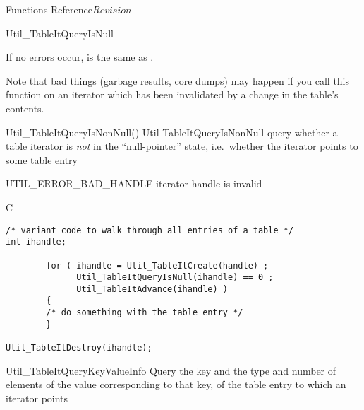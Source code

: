 \begin{cactuspart}{ Functions Reference}{}{$Revision$}
\begin{FunctionDescription}{Util\_TableItQueryIsNull}
\begin{Discussion}
If no errors occur,
is the same as
.

Note that bad things (garbage results, core dumps) may happen if
you call this function on an iterator which has been invalidated
by a change in the table's contents.
\end{Discussion}

\begin{SeeAlsoSection}
\begin{SeeAlso2} {Util\_TableItQueryIsNonNull()} {Util-TableItQueryIsNonNull}
query whether a table iterator is {\em not\/} in the ``null-pointer'' state,
i.e.\ whether the iterator points to some table entry
\end{SeeAlso2}
\end{SeeAlsoSection}

\begin{ErrorSection}
\begin{Error}{UTIL\_ERROR\_BAD\_HANDLE}
iterator handle is invalid
\end{Error}
\end{ErrorSection}

\begin{ExampleSection}
\begin{Example}{C}
\begin{verbatim}
/* variant code to walk through all entries of a table */
int ihandle;

        for ( ihandle = Util_TableItCreate(handle) ;
              Util_TableItQueryIsNull(ihandle) == 0 ;
              Util_TableItAdvance(ihandle) )
        {
        /* do something with the table entry */
        }

Util_TableItDestroy(ihandle);
\end{verbatim}
\end{Example}
\end{ExampleSection}
\end{FunctionDescription}


\begin{FunctionDescription}{Util\_TableItQueryKeyValueInfo}
\label{Util-TableItQueryKeyValueInfo}
Query the key and the type and number of elements of the value
corresponding to that key, of the table entry to which an iterator points


\end{FunctionDescription}
\end{cactuspart}
